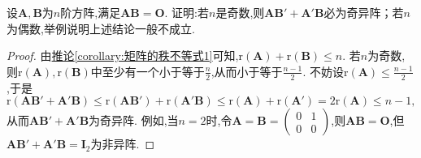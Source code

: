 \documentclass[../../main.tex]{subfiles}%
\begin{document}
\begin{example}
设\(\boldsymbol{A},\boldsymbol{B}\)为\(n\)阶方阵,满足\(\boldsymbol{A}\boldsymbol{B}=\boldsymbol{O}\). 证明:若\(n\)是奇数,则\(\boldsymbol{A}\boldsymbol{B}'+\boldsymbol{A}'\boldsymbol{B}\)必为奇异阵；若\(n\)为偶数,举例说明上述结论一般不成立.
\end{example}
\begin{proof}

由\hyperref[corollary:矩阵的秩不等式1]{推论\ref{corollary:矩阵的秩不等式1}}可知,\(\mathrm{r}(\boldsymbol{A})+\mathrm{r}(\boldsymbol{B})\leqslant  n\). 若\(n\)为奇数,则\(\mathrm{r}(\boldsymbol{A}),\mathrm{r}(\boldsymbol{B})\)中至少有一个小于等于\(\frac{n}{2}\),从而小于等于\(\frac{n - 1}{2}\). 不妨设\(\mathrm{r}(\boldsymbol{A})\leqslant \frac{n - 1}{2}\),于是
\[
\mathrm{r}(\boldsymbol{A}\boldsymbol{B}'+\boldsymbol{A}'\boldsymbol{B})\leqslant \mathrm{r}(\boldsymbol{A}\boldsymbol{B}')+\mathrm{r}(\boldsymbol{A}'\boldsymbol{B})\leqslant \mathrm{r}(\boldsymbol{A})+\mathrm{r}(\boldsymbol{A}') = 2\mathrm{r}(\boldsymbol{A})\leqslant  n - 1,
\]
从而\(\boldsymbol{A}\boldsymbol{B}'+\boldsymbol{A}'\boldsymbol{B}\)为奇异阵. 例如,当\(n = 2\)时,令\(\boldsymbol{A}=\boldsymbol{B}=\begin{pmatrix}
0&1\\
0&0
\end{pmatrix}\),则\(\boldsymbol{A}\boldsymbol{B}=\boldsymbol{O}\),但\(\boldsymbol{A}\boldsymbol{B}'+\boldsymbol{A}'\boldsymbol{B}=\boldsymbol{I}_2\)为非异阵.


\end{proof}
\end{document}
